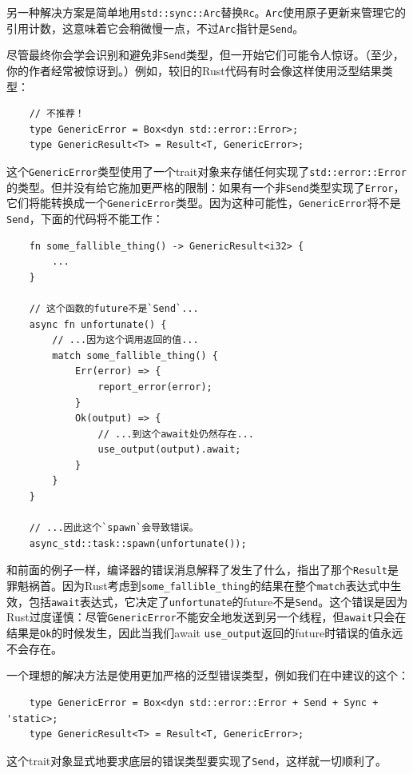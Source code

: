 另一种解决方案是简单地用\texttt{std::sync::Arc}替换\texttt{Rc}。\texttt{Arc}使用原子更新来管理它的引用计数，这意味着它会稍微慢一点，不过\texttt{Arc}指针是\texttt{Send}。

尽管最终你会学会识别和避免非\texttt{Send}类型，但一开始它们可能令人惊讶。（至少，你的作者经常被惊讶到。）例如，较旧的Rust代码有时会像这样使用泛型结果类型：
\begin{verbatim}
    // 不推荐！
    type GenericError = Box<dyn std::error::Error>;
    type GenericResult<T> = Result<T, GenericError>;
\end{verbatim}

这个\texttt{GenericError}类型使用了一个trait对象来存储任何实现了\texttt{std::error::Error}的类型。但并没有给它施加更严格的限制：如果有一个非\texttt{Send}类型实现了\texttt{Error}，它们将能转换成一个\texttt{GenericError}类型。因为这种可能性，\texttt{GenericError}将不是\texttt{Send}，下面的代码将不能工作：
\begin{verbatim}
    fn some_fallible_thing() -> GenericResult<i32> {
        ...
    }

    // 这个函数的future不是`Send`...
    async fn unfortunate() {
        // ...因为这个调用返回的值...
        match some_fallible_thing() {
            Err(error) => {
                report_error(error);
            }
            Ok(output) => {
                // ...到这个await处仍然存在...
                use_output(output).await;
            }
        }
    }

    // ...因此这个`spawn`会导致错误。
    async_std::task::spawn(unfortunate());
\end{verbatim}

和前面的例子一样，编译器的错误消息解释了发生了什么，指出了那个\texttt{Result}是罪魁祸首。因为Rust考虑到\texttt{some\_fallible\_thing}的结果在整个\texttt{match}表达式中生效，包括\texttt{await}表达式，它决定了\texttt{unfortunate}的future不是\texttt{Send}。这个错误是因为Rust过度谨慎：尽管\texttt{GenericError}不能安全地发送到另一个线程，但\texttt{await}只会在结果是\texttt{Ok}的时候发生，因此当我们await \texttt{use\_output}返回的future时错误的值永远不会存在。

一个理想的解决方法是使用更加严格的泛型错误类型，例如我们在中建议的这个：
\begin{verbatim}
    type GenericError = Box<dyn std::error::Error + Send + Sync + 'static>;
    type GenericResult<T> = Result<T, GenericError>;
\end{verbatim}

这个trait对象显式地要求底层的错误类型要实现了\texttt{Send}，这样就一切顺利了。

